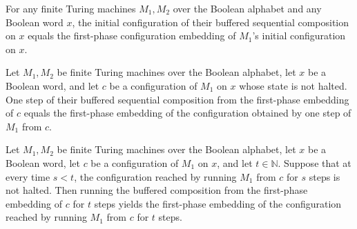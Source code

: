 \begin{lemma}
\label{Turing.FinTM.bufferedFirstCfg_init}
\leanok
{}
For any finite Turing machines $M_1,M_2$ over the Boolean alphabet and any Boolean word
$x$, the initial configuration of their buffered sequential composition on $x$ equals
the first-phase configuration embedding of $M_1$'s initial configuration on $x$.
\end{lemma}

\begin{lemma}
\label{Turing.FinTM.bufferedFirstCfg_step}
\leanok
{}
Let $M_1,M_2$ be finite Turing machines over the Boolean alphabet, let $x$ be a Boolean
word, and let $c$ be a configuration of $M_1$ on $x$ whose state is not halted. One step
of their buffered sequential composition from the first-phase embedding of $c$ equals
the first-phase embedding of the configuration obtained by one step of $M_1$ from $c$.
\end{lemma}

\begin{lemma}
\label{Turing.FinTM.bufferedFirstCfg_run}
\leanok
{}
Let $M_1,M_2$ be finite Turing machines over the Boolean alphabet, let $x$ be a Boolean
word, let $c$ be a configuration of $M_1$ on $x$, and let $t\in\mathbb{N}$. Suppose that
at every time $s<t$, the configuration reached by running $M_1$ from $c$ for $s$ steps
is not halted. Then running the buffered composition from the first-phase embedding of
$c$ for $t$ steps yields the first-phase embedding of the configuration reached by
running $M_1$ from $c$ for $t$ steps.
\end{lemma}

